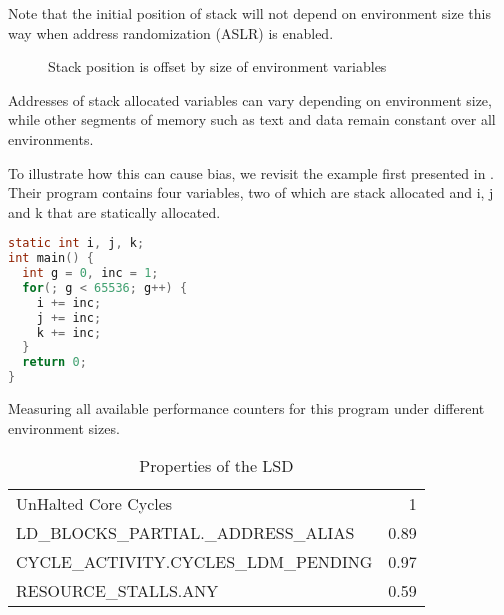 \documentclass[a4paper,11pt,twocolumn,twoside]{article}
\begin{document}
Note that the initial position of stack will not depend on environment size this way when address randomization (ASLR) is enabled.
\begin{figure}
  \caption{Stack position is offset by size of environment variables}
  \label{fig:stack}
\end{figure}

Addresses of stack allocated variables can vary depending on environment size, while other segments of memory such as text and data remain constant over all environments.

To illustrate how this can cause bias, we revisit the example first presented in \cite{Mytkowicz:2009:WrongData}.
Their program contains four variables, two of which are stack allocated and i, j and k that are statically allocated.

\begin{lstlisting}[language=C]
static int i, j, k;
int main() {
  int g = 0, inc = 1;
  for(; g < 65536; g++) {
    i += inc;
    j += inc;
    k += inc; 
  }
  return 0;
}
\end{lstlisting}

Measuring all available performance counters for this program under different environment sizes.

\begin{small}
\begin{table}
  \caption{Properties of the LSD}
  \begin{tabular}{@{} l r @{}}
    \toprule
      UnHalted Core Cycles & 1 \\
      LD\_BLOCKS\_PARTIAL.\_ADDRESS\_ALIAS & 0.89 \\
      CYCLE\_ACTIVITY.CYCLES\_LDM\_PENDING & 0.97 \\
      RESOURCE\_STALLS.ANY & 0.59 \\
    \bottomrule
  \end{tabular}
\end{table}
\end{small}
\end{document}
